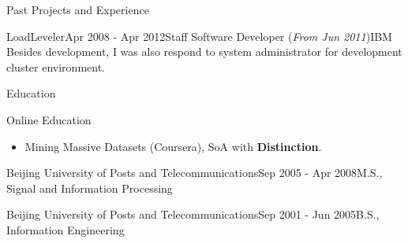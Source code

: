 \documentclass{resume} %
\begin{document}
\begin{rSection}{Past Projects and Experience}
\begin{rSubsection}{LoadLeveler}{Apr 2008 - Apr 2012}{Staff Software Developer (\textit{From Jun 2011})}{IBM}
Besides development, I was also respond to system administrator for development cluster environment.
\end{rSubsection}
\vspace{1.8em}

\begin{rSection}{Education}
\begin{rSubsection}{Online Education}{}{}{}
  \begin{itemize}\vspace{-0.6em}
    \item Mining Massive Datasets (Coursera), SoA with \textbf{Distinction}.
  \end{itemize}
\end{rSubsection}

\begin{rSubsection}{Beijing University of Posts and Telecommunications}{Sep 2005 - Apr 2008}{M.S., Signal and Information Processing}{}
\end{rSubsection}

\begin{rSubsection}{Beijing University of Posts and Telecommunications}{Sep 2001 - Jun 2005}{B.S., Information Engineering}{}
\end{rSubsection}

\end{rSection}







\end{rSection}
\end{document}
